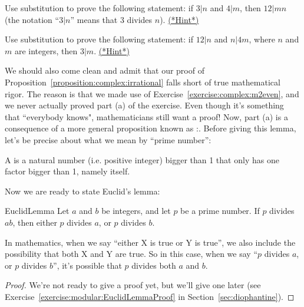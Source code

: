 \begin{exercise}{2}
Use substitution to prove the following statement:  if $3 | n$ and $4 | m$, then $12 | mn$ (the notation ``$3 | n$'' means that 3 divides $n$). 
\hyperref[sec:complex:hints]{(*Hint*)}
\end{exercise}

\begin{exercise}{3}
Use substitution to prove the following statement:  if $12 | n$ and $n | 4m$, where $n$ and $m$ are integers, then $3 | m$.
\hyperref[sec:complex:hints]{(*Hint*)}
\end{exercise}

We should also come clean and admit that our proof of Proposition~\ref{proposition:complex:irrational} falls short of true mathematical rigor. The reason is that we made use of Exercise~\ref{exercise:complex:m2even}, and we never actually proved part (a) of the exercise. Even though it's something that ``everybody knows", mathematicians still want a proof! Now, part (a) is a consequence of a more general proposition known as :. Before giving this lemma, let's be precise about what we mean by ``prime number'':

\begin{defn}\label{defPrime} A  is a natural number (i.e. positive integer) bigger than 1 that only has one factor bigger than 1, namely itself.
\end{defn}

Now we are ready to state Euclid's lemma: 

\begin{prop}{EuclidLemma}
Let $a$ and $b$ be integers, and let $p$ be a prime number. If $p$ divides $ab$, then either $p$ divides $a$, or $p$ divides $b$.

\begin{rem}
In mathematics, when we say ``either X is true or Y is true'', we also include the possibility that both X and Y are true. So in this case, when we say ``$p$ divides $a$, or $p$ divides $b$'', it's possible that $p$ divides both $a$ and $b$.
\end{rem}

\end{prop}
\begin{proof}
We're not ready to give a proof yet, but we'll give one later (see Exercise~\ref{exercise:modular:EuclidLemmaProof}  in Section~\ref{sec:diophantine}).
\end{proof}


